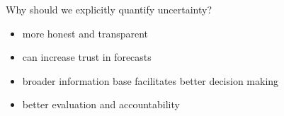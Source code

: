 \documentclass[en]{sdqbeamer}
\begin{document}
\begin{frame}[t]{Why should we explicitly quantify uncertainty?}
\begin{itemize}
    \item more honest and transparent \smallskip
    \item can increase trust in forecasts \smallskip
    \item broader information base facilitates better decision making \smallskip
    \item better evaluation and accountability
\end{itemize}
\end{frame}
\end{document}

